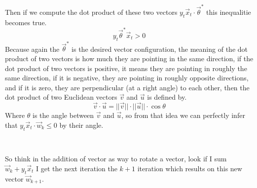 \documentclass[12pt]{article}
\begin{document}
Then if we compute
the dot product of these two vectors $y_t\vec{x}_t \cdot \vec{\theta}^*$ this inequalitie
becomes true.
\[
  y_t\vec{\theta}^*\vec{x}_t > 0
\]
Because again the $\vec{\theta}^*$ is the desired vector configuration, the meaning of the dot product
of two vectors is how much they are pointing in the same direction,
if the dot product of two vectors is positive, it means they are pointing in
roughly the same direction, if it is negative, they are pointing in roughly opposite
directions, and if it is zero, they are perpendicular (at a right angle) to each other,
then the dot product of two Euclidean vectors $\vec{v}$ and $\vec{u}$ is defined by.
\[
  \vec{v} \cdot \vec{u} = ||\vec{v}|| \cdot ||\vec{u}|| \cdot \cos{\theta}
\]
Where $\theta$ is the angle between $\vec{v}$ and $\vec{u}$, so
from that idea we can perfectly infer that $y_t\vec{x}_t \cdot \vec{w}_k \le 0$ by their angle.\\
\begin{center}
 \\
\end{center}
So think in the addition of vector as way to rotate a vector, look if I sum $\vec{w}_k + y_t\vec{x}_t$
I get the next iteration the $k + 1$ iteration which results on this new vector $\vec{w}_{k + 1}$.
\begin{center}
 \\
\end{center}
\end{document}
